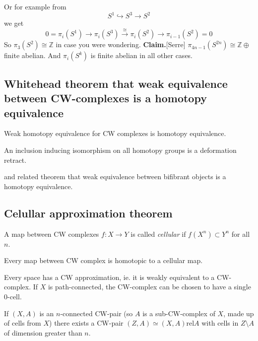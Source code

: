 Or for example from
$$S^1\hookrightarrow S^3\to S^2$$
we get
$$0=\pi_i(S^1)\to
\pi_i(S^3)\overset{\cong}{\to}\pi_i(S^2)
\to\pi_{i-1}(S^2)=0$$
So $\pi_3(S^2)\cong\mathbb{Z}$ in case you
were wondering.
{\bf Claim.}[Serre]
	$\pi_{4n-1}(S^{2n})\cong\mathbb{Z}
	\oplus$finite
	abelian. And $\pi_i(S^k)$ is finite abelian
	in all other cases.

\subsection{Whitehead theorem that weak
equivalence between CW-complexes is a
homotopy equivalence}
\label{subsection-white-theor-weak-equiv}

\begin{theorem}[Whitehead]
\label{theorem-whitehead}
	Weak homotopy equivalence for CW complexes
	is homotopy equivalence.

	An inclusion inducing isomorphism on all
	homotopy groups is a deformation retract.
\end{theorem}


and related theorem that weak equivalence
between bifibrant objects is a homotopy
equivalence.
\subsection{Celullar approximation theorem}
\label{subsection-celul-appro-theor}

\begin{definition}
\label{definition-cellular-map}
	A map between CW complexes $f:X\to Y$ is
	called {\it cellular} if $f(X^{n})\subset
	Y^{n}$ for all $n$.
\end{definition}
\begin{theorem}
\label{theorem-every-map-betwe-cw-compl}
	Every map between CW complex is homotopic to
	a cellular map.
\end{theorem}
\begin{theorem}[CW approximation]
\label{theorem-cw-approximation}
	Every space has a CW approximation, ie. it
	is weakly equivalent to a CW-complex.
	If $X$ is path-connected, the CW-complex can
	be chosen to have a single 0-cell.

	If $(X,A)$ is an $n$-connected CW-pair (so
	$A$ is a sub-CW-complex of $X$, made up of
	cells from $X$) there exists a CW-pair
	$(Z,A)\simeq (X,A)\text{rel}A$ with cells in
	$Z\setminus A$ of dimension greater than
	$n$.
\end{theorem}


